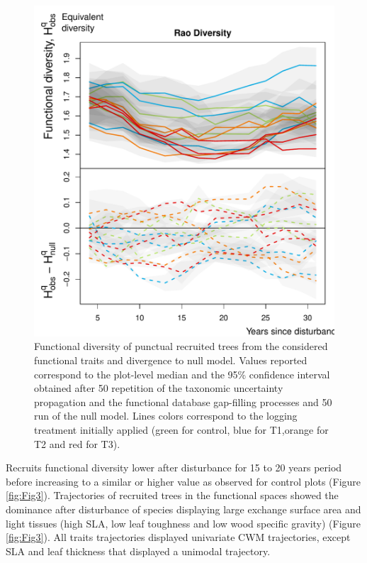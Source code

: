 \documentclass[fleqn,10pt]{ArtEcoFoG} %
\begin{document}
\begin{figure}

{\centering \includegraphics[width=0.7\linewidth]{RecruitmentTrajectories_files/figure-latex/Fig2-1} 

}

\caption{Functional diversity of punctual recruited trees from the considered functional traits and divergence to null model. Values reported correspond to the plot-level median and the 95\% confidence interval obtained after 50 repetition of the taxonomic uncertainty propagation and the functional database gap-filling processes and 50 run of the null model. Lines colors correspond to the logging treatment initially applied (green for control, blue for T1,orange for T2 and red for T3).}\label{fig:Fig2}
\end{figure}

Recruits functional diversity lower after disturbance for 15 to 20 years
period before increasing to a similar or higher value as observed for
control plots (Figure \ref{fig:Fig3}). Trajectories of recruited trees
in the functional spaces showed the dominance after disturbance of
species displaying large exchange surface area and light tissues (high
SLA, low leaf toughness and low wood specific gravity) (Figure
\ref{fig:Fig3}). All traits trajectories displayed univariate CWM
trajectories, except SLA and leaf thickness that displayed a unimodal
trajectory.
\end{document}
